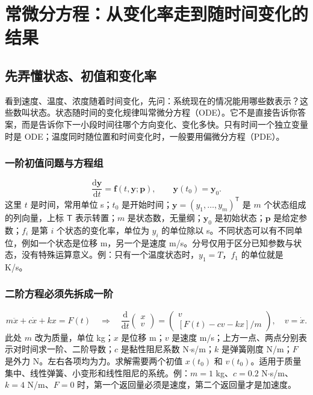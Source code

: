 \chapter{常微分方程：从变化率走到随时间变化的结果}
\section{先弄懂状态、初值和变化率}
看到速度、温度、浓度随着时间变化，先问：系统现在的情况能用哪些数表示？这些数叫状态。状态随时间的变化规律叫常微分方程（ODE）。它不是直接告诉你答案，而是告诉你下一小段时间往哪个方向变化、变化多快。只有时间一个独立变量时是 ODE；温度同时随位置和时间变化时，一般要用偏微分方程（PDE）。

\subsection{一阶初值问题与方程组}
\begin{equation}
\frac{\mathrm d\boldsymbol y}{\mathrm dt}=\boldsymbol f(t,\boldsymbol y;\boldsymbol p),\qquad \boldsymbol y(t_0)=\boldsymbol y_0.
\end{equation}
这里 $t$ 是时间，常用单位 s；$t_0$ 是开始时间；$\boldsymbol y=(y_1,\ldots,y_m)^{\mathsf T}$ 是 $m$ 个状态组成的列向量，上标 $\mathsf T$ 表示转置；$m$ 是状态数，无量纲；$\boldsymbol y_0$ 是初始状态；$\boldsymbol p$ 是给定参数；$f_i$ 是第 $i$ 个状态的变化率，单位为 $y_i$ 的单位除以 s。不同状态可以有不同单位，例如一个状态是位移 m，另一个是速度 m/s。分号仅用于区分已知参数与状态，没有特殊运算意义。例：只有一个温度状态时，$y_1=T$，$f_1$ 的单位就是 K/s。

\subsection{二阶方程必须先拆成一阶}
\begin{equation}
m\ddot x+c\dot x+kx=F(t)\quad\Longrightarrow\quad
\frac{\mathrm d}{\mathrm dt}\begin{pmatrix}x\\v\end{pmatrix}
=\begin{pmatrix}v\\ {}[F(t)-cv-kx]/m\end{pmatrix},\quad v=\dot x.
\end{equation}
此处 $m$ 改为质量，单位 kg；$x$ 是位移 m；$v$ 是速度 m/s；上方一点、两点分别表示对时间求一阶、二阶导数；$c$ 是黏性阻尼系数 N$\cdot$s/m；$k$ 是弹簧刚度 N/m；$F$ 是外力 N。左右各项均为力。求解需要两个初值 $x(t_0)$ 和 $v(t_0)$。适用于质量集中、线性弹簧、小变形和线性阻尼的系统。例：$m=1$ kg、$c=0.2$ N$\cdot$s/m、$k=4$ N/m、$F=0$ 时，第一个返回量必须是速度，第二个返回量才是加速度。

